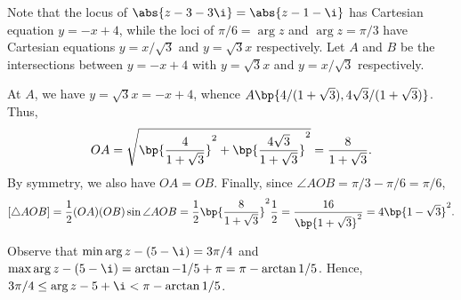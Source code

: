 \begin{solution}
\begin{ppart}
\begin{center}
            \end{center}
    \end{ppart}
    \begin{ppart}
        Note that the locus of $\abs{z - 3 - 3\i} = \abs{z - 1 - \i}$ has Cartesian equation $y = -x + 4$, while the loci of $\pi/6 = \arg{z}$ and $\arg{z} = \pi/3$ have Cartesian equations $y = x/\sqrt3$ and $y = \sqrt3 x$ respectively. Let $A$ and $B$ be the intersections between $y = -x + 4$ with $y = \sqrt3 x$ and $y = x/\sqrt3$ respectively.

        At $A$, we have $y = \sqrt3 x = -x + 4$, whence $A\bp{4/(1 + \sqrt3), 4\sqrt3/(1 + \sqrt3)}$. Thus, \[OA = \sqrt{\bp{\frac{4}{1 + \sqrt3}}^2 + \bp{\frac{4\sqrt3}{1 + \sqrt3}}^2} = \frac{8}{1 + \sqrt3}.\] By symmetry, we also have $OA = OB$. Finally, since $\angle AOB = \pi/3 - \pi/6 = \pi/6$, \[[\triangle AOB] = \frac12 (OA)(OB)\sin \angle AOB = \frac12 \bp{\frac8{1 + \sqrt3}}^2 \frac12 = \frac{16}{\bp{1 + \sqrt3}^2} = 4\bp{1 - \sqrt3}^2.\]
    \end{ppart}
    \begin{ppart}
        Observe that $\min \arg{z - (5 - \i)} = 3\pi/4$ and $\max \arg{z - (5 -\i)} = \arctan{-1/5} + \pi = \pi -\arctan{1/5}$. Hence, $3\pi/4 \leq \arg{z - 5 + \i} < \pi-\arctan{1/5}$.
    \end{ppart}
\end{solution}

